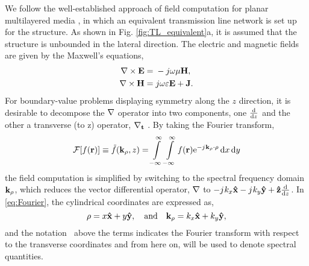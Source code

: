 \documentclass[12pt]{article}
\begin{document}
We follow the well-established approach of field computation for planar multilayered media \cite{michalski1997multilayered, michalski2005}, in which an equivalent transmission line network is set up for the structure. As shown in Fig. \ref{fig:TL_equivalent}a, it is assumed that the structure is unbounded in the lateral direction. The electric and magnetic fields are given by the Maxwell's equations,
\begin{subequations}
  \begin{align}
    \nabla\times{\mathbf{E}} ={}& -j \omega \mu \mathbf{H},
    \label{eq:E}\\
    \nabla\times{\mathbf{H}} ={}& j \omega \varepsilon \mathbf{E} + \mathbf{J}.
    \label{eq:H}
  \end{align}
  \label{eq:MaxE}%
\end{subequations}
%
For boundary-value problems displaying symmetry along the $z$ direction, it is desirable to decompose the $\mathbf{\nabla}$ operator into two components, one $\dv{}{z}$ and the other a transverse (to z) operator, $\mathbf{\nabla_t}$ \cite[p. 64]{felsen1994}. By taking the Fourier transform,
%
\begin{equation}
    \mathcal{F}[f(\mathbf{r})] \equiv \tilde{f}(\mathbf{k_{\rho}},z) = \int\limits_{-\infty}^\infty \int\limits_{-\infty}^\infty
    f(\mathbf{r}) \mathrm{e}^{-j\mkern1mu \mathbf{k_{\rho}} \cdot \mathbf{\rho}} \mathop{}\!\mathrm{d}{x} \mathop{}\!\mathrm{d}{y}
    \label{eq:Fourier}
\end{equation}
%
the field computation is simplified by switching to the spectral frequency domain $\mathbf{k_{\rho}}$, which reduces the vector differential operator, $\mathbf{\nabla}$ to $-j\mkern1mu k_x \mathbf{\hat{x}} - j\mkern1mu k_y \mathbf{\hat{y}} + \mathbf{\hat{z}}\dv{}{z}$. In \eqref{eq:Fourier}, the cylindrical coordinates are expressed as,
%
\begin{equation}
  \mathbf{\rho} = x\mathbf{\hat{x}} + y\mathbf{\hat{y}}, \quad \text{and} \quad
  \mathbf{k_{\rho}} = k_x\mathbf{\hat{x}} + k_y\mathbf{\hat{y}},
\end{equation}
%
and the notation $~$ above the terms indicates the Fourier transform with respect to the transverse coordinates and from here on, will be used to denote spectral quantities.
\end{document}
